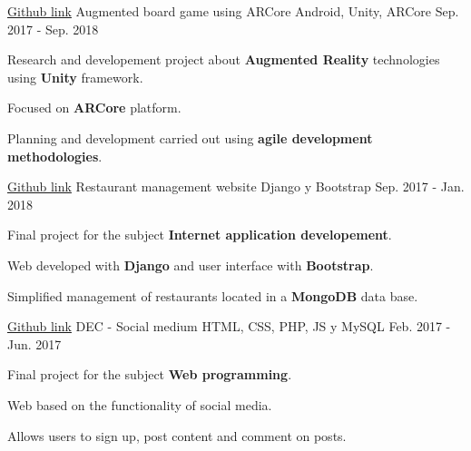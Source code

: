 

\begin{cventries}

  \cventry
    {\href{https://github.com/matl1995/TFG}{Github link}} %
    {Augmented board game using ARCore} %
    {Android, Unity, ARCore} %
    {Sep. 2017 - Sep. 2018} %
    {
      \begin{cvitems} %
        \item {Research and developement project about \textbf{Augmented Reality} technologies using \textbf{Unity} framework.}
        \item {Focused on \textbf{ARCore} platform.}
        \item {Planning and development carried out using \textbf{agile development methodologies}.}
      \end{cvitems}
    }

  \cventry
    {\href{https://github.com/matl1995/DAI}{Github link}} %
    {Restaurant management website} %
    {Django y Bootstrap} %
    {Sep. 2017 - Jan. 2018} %
    {
      \begin{cvitems} %
        \item {Final project for the subject \textbf{Internet application developement}.}
        \item {Web developed with \textbf{Django} and user interface with \textbf{Bootstrap}.}
        \item {Simplified management of restaurants located in a \textbf{MongoDB} data base.}
      \end{cvitems}
    }

  \cventry
    {\href{https://github.com/matl1995/PW}{Github link}} %
    {DEC - Social medium} %
    {HTML, CSS, PHP, JS y MySQL} %
    {Feb. 2017 - Jun. 2017} %
    {
      \begin{cvitems} %
        \item {Final project for the subject \textbf{Web programming}.}
        \item {Web based on the functionality of social media.}
        \item {Allows users to sign up, post content and comment on posts.}
      \end{cvitems}
    }


\end{cventries}
